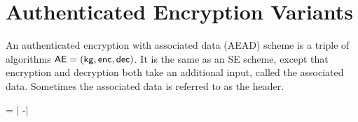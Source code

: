 \section{Authenticated Encryption Variants}
\label{sec:authenc}

An authenticated encryption with associated data (AEAD) scheme is a triple of
algorithms $\textnormal{\textsf{AE}} = ({\sf kg},{\sf enc},{\sf dec})$. It is the same as an SE scheme, except
that encryption and decryption both take an additional input, called the
associated data. Sometimes the associated data is referred to as the header.



\bnm
\AdvRORCCA{\SE}{\advA} = \left|
                                    -\right|
\enm



